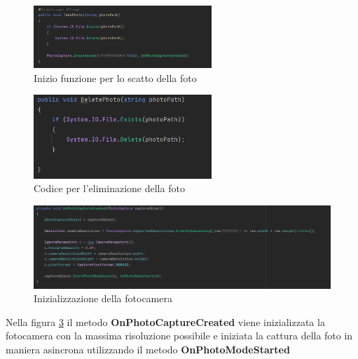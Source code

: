\begin{figure}[H]
    \centering
    \includegraphics[width=0.6\textwidth,height=\textheight,keepaspectratio]{figures/chapter_1/TakePhoto_CODICE.png}
    \caption{Inizio funzione per lo scatto della foto}
    \label{fig:takePhoto}
\end{figure}
\begin{figure}[H]
    \centering
    \includegraphics[width=0.6\textwidth,height=\textheight,keepaspectratio]{figures/chapter_1/DeletePhoto_CODICE.png}
    \caption{Codice per l'eliminazione della foto}
    \label{fig:deletePhoto}
\end{figure}
\begin{figure}[H]
    \centering
    \includegraphics[width=1\textwidth,height=\textheight,keepaspectratio]{figures/chapter_1/OnPhotoCaptureCreated_CODICE.png}
    \caption{Inizializzazione della fotocamera}
    \label{fig:onPhotoCaptureCreated}
\end{figure}
Nella figura \ref{fig:onPhotoCaptureCreated} il metodo \textbf{OnPhotoCaptureCreated} viene inizializzata la fotocamera con la massima risoluzione possibile e iniziata la cattura della foto in maniera asincrona utilizzando il metodo \textbf{OnPhotoModeStarted}

